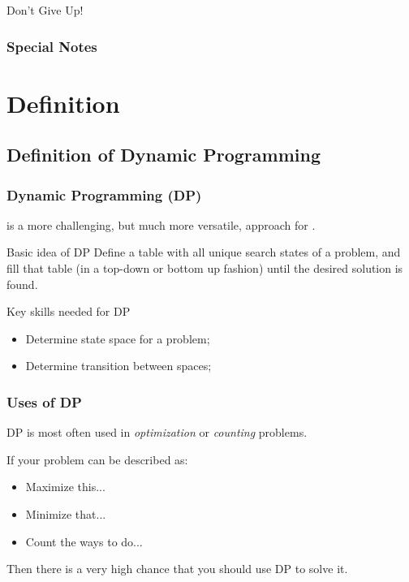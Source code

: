 \documentclass{beamer}
\begin{document}
\begin{frame}
  \begin{center}
    Don't Give Up!
  \end{center}
\end{frame}

\begin{frame}
  \frametitle{Special Notes}
\end{frame}

\section{Definition}
\subsection{Definition of Dynamic Programming}
\begin{frame}
  \frametitle{Dynamic Programming (DP)}

   is a more challenging, but much
  more versatile, approach for .

  \vfill

  \begin{block}{Basic idea of DP}
    Define a table with all unique search states of a problem, and 
    fill that table (in a top-down or bottom up fashion) until the 
    desired solution is found.
  \end{block}

  \begin{exampleblock}{Key skills needed for DP}
    \begin{itemize}
    \item Determine state space for a problem;
    \item Determine transition between spaces;
    \end{itemize}
  \end{exampleblock}
\end{frame}

\begin{frame}
  \frametitle{Uses of DP} 

  DP is most often used in \emph{optimization} or \emph{counting}
  problems.

  \vfill

  If your problem can be described as:
  \begin{itemize}
  \item Maximize this...
  \item Minimize that...
  \item Count the ways to do...
  \end{itemize}
  Then there is a very high chance that you should use DP to solve it.
\end{frame}
\end{document}
